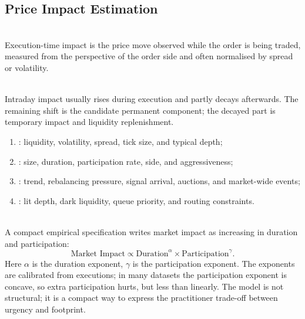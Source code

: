 \subsection{Price Impact Estimation}

\begin{definition} \\
Execution-time impact is the price move observed while the order is being traded, measured from the perspective of the order side and often normalised by spread or volatility.
\end{definition}

\begin{empiricalfinding} \\
Intraday impact usually rises during execution and partly decays afterwards. The remaining shift is the candidate permanent component; the decayed part is temporary impact and liquidity replenishment.
\end{empiricalfinding}

\begin{taxonomy} 
\begin{enumerate}[label=\roman*.]
\setlength{\itemsep}{0pt}
\item {}: liquidity, volatility, spread, tick size, and typical depth;
\item {}: size, duration, participation rate, side, and aggressiveness;
\item {}: trend, rebalancing pressure, signal arrival, auctions, and market-wide events;
\item {}: lit depth, dark liquidity, queue priority, and routing constraints.
\end{enumerate}
\end{taxonomy}

\begin{model} \\
A compact empirical specification writes market impact as increasing in duration and participation:
\begin{equation*}
\text{Market Impact} \propto \text{Duration}^{\alpha}\times \text{Participation}^{\gamma}.
\end{equation*}
Here $\alpha$ is the duration exponent, $\gamma$ is the participation exponent. The exponents are calibrated from executions; in many datasets the participation exponent is concave, so extra participation hurts, but less than linearly. The model is not structural; it is a compact way to express the practitioner trade-off between urgency and footprint.
\end{model}

